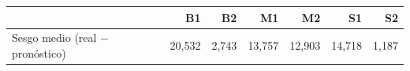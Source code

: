 \begin{tabular}{lrrrrrr}
\toprule
 & B1 & B2 & M1 & M2 & S1 & S2 \\
\midrule
Sesgo medio (real $-$ pronóstico) & 20,532 & 2,743 & 13,757 & 12,903 & 14,718 & 1,187 \\
\bottomrule
\end{tabular}
